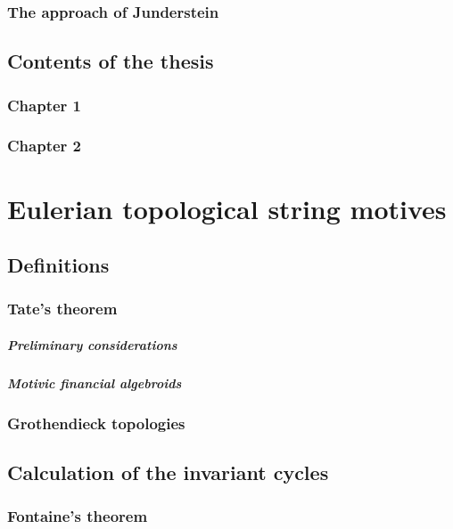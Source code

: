 \documentclass[12pt, oneside]{book}
\theoremstyle{plain}
\theoremstyle{definition}
\begin{document}
\subsection{The approach of Junderstein}
\lipsum[23]
\section{Contents of the thesis}\label{contentsofthesis}
\lipsum[23]
\subsection{Chapter 1}
\lipsum[23]
\subsection{Chapter 2}
\lipsum[23]




\chapter{Eulerian topological string motives}
\lipsum[23]
\section{Definitions}
\lipsum[23]
\subsection{Tate's theorem}
\paragraph{Preliminary considerations}
\lipsum[23]
\paragraph{Motivic financial algebroids}
\lipsum[23]

\subsection{Grothendieck topologies}
\lipsum[23]

\section{Calculation of the invariant cycles}
\lipsum[23]

\subsection{Fontaine's theorem}
\end{document}
